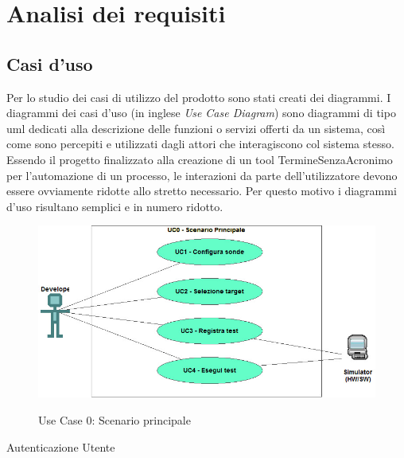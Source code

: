\chapter{Analisi dei requisiti}
\label{chap:analisi-requisiti}

\section{Casi d'uso}
Per lo studio dei casi di utilizzo del prodotto sono stati creati dei diagrammi.
I diagrammi dei casi d'uso (in inglese \textit{Use Case Diagram}) sono diagrammi di tipo \gls{uml} dedicati alla descrizione delle funzioni o servizi offerti da un sistema, così come sono percepiti e utilizzati dagli attori che interagiscono col sistema stesso.
Essendo il progetto finalizzato alla creazione di un tool \gls{TermineSenzaAcronimo} per l'automazione di un processo, le interazioni da parte dell'utilizzatore devono essere ovviamente ridotte allo stretto necessario. Per questo motivo i diagrammi d'uso risultano semplici e in numero ridotto.


\begin{figure}[H]
    \vspace{2em}
    \centering
    \includegraphics[alt={Testo alternativo dell'immagine}, width=0.75\columnwidth]{img/usecase/scenario-principale.jpeg}
    \caption{Use Case 0: Scenario principale}
    \label{fig:scenario_principale}
\end{figure}

\begin{usecase}{1}{Autenticazione Utente}
    \label{uc:uc1_auth}
\end{usecase}

